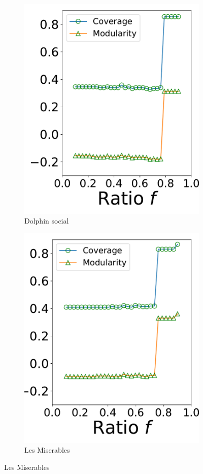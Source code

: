 \begin{figure}[!htb]
\begin{subfigure}{.3\textwidth}
\includegraphics[width=.99\linewidth]{img/chap2/dolphins_coverage_modularity.pdf}
\caption{Dolphin social}
\end{subfigure}
\begin{subfigure}{.3\textwidth} 
\centering
\includegraphics[width=.99\linewidth]{img/chap2/lesmis_coverage_modularity.pdf}
\caption{Les Miserables}
\end{subfigure}


\end{figure}
